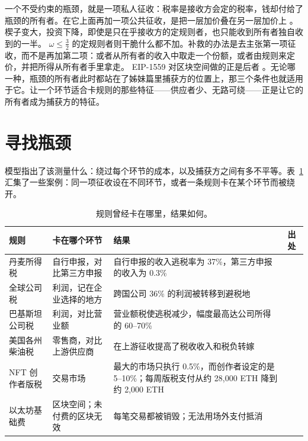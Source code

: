 一个不受约束的瓶颈，就是一项私人征收：税率是接收方会定的税率，钱却付给了瓶颈的所有者。在它上面再加一项公共征收，是把一层加价叠在另一层加价上 \citep{Spengler1950}。楔子变大，投资下降，即使是只在乎接收方的定规则者，也只能收到所有者独自收到的一半。
$\omega\le\frac32$ 的定规则者则干脆什么都不加。补救的办法是去主张第一项征收，而不是再加第二项：或者从所有者的收入中取走一个份额，或者由规则来定价，并把所得从所有者手里拿走。
EIP-1559 对区块空间做的正是后者 \citep{Buterin2019}。无论哪一种，瓶颈的所有者此时都站在了姊妹篇里捕获方的位置上，那三个条件也就适用于它。让一个环节适合卡规则的那些特征——供应者少、无路可绕——正是让它的所有者成为捕获方的特征。

\section{寻找瓶颈}\label{sec:find}

模型指出了该测量什么：绕过每个环节的成本，以及捕获方之间有多不平等。表~\ref{tab:evidence}
汇集了一些案例：同一项征收设在不同环节，或者一条规则卡在某个环节而被绕开。

\begin{table}[t]
\centering
\caption{规则曾经卡在哪里，结果如何。}
\label{tab:evidence}
\small
\renewcommand{\arraystretch}{1.28}
\begin{tabular}{@{}>{\raggedright\arraybackslash}p{}>{\raggedright\arraybackslash}p{}>{\raggedright\arraybackslash}p{}>{\raggedright\arraybackslash}p{}@{}}
\toprule
规则 & 卡在哪个环节 & 结果 & 出处\\
\midrule
丹麦所得税 & 自行申报，对比第三方申报 & 自行申报的收入逃税率为 37\%，第三方申报的收入为
0.3\% & \citet{KlevenEtAl2011}\\
全球公司税 & 利润，记在企业选择的地方 & 跨国公司 36\% 的利润被转移到避税地 &
\citet{TorslovWierZucman2023}\\
巴基斯坦公司税 & 利润，对比营业额 & 营业额税使逃税减少，幅度最高达公司所得的 60--70\% &
\citet{BestEtAl2015}\\
美国各州柴油税 & 零售商，对比上游供应商 & 在上游征收提高了税收收入和税负转嫁 &
\citet{KopczukEtAl2016}\\
NFT 创作者版税 & 交易市场 & 最大的市场只执行 0.5\%，而创作者设定的是 5--10\%；每周版税支付从约 28{,}000 ETH 降到约 2{,}000 ETH & \citet{Akers2023}\\
以太坊基础费 & 区块空间；未付费的区块无效 & 每笔交易都被销毁；无法用场外支付抵消 &
\citet{Roughgarden2021}\\
\bottomrule
\end{tabular}
\end{table}


